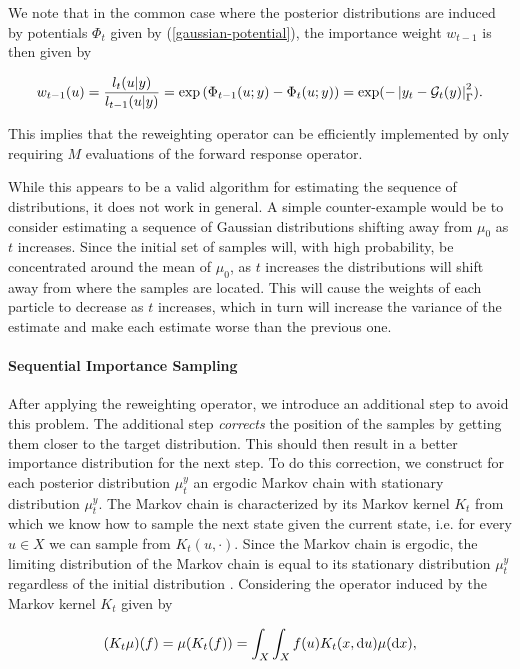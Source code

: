 We note that in the common case where the posterior distributions are induced by potentials $\Phi_t$ given by (\ref{gaussian-potential}), the importance weight $w_{t-1}$ is then given by

\begin{equation}\label{simple-weights}
  w_{t-1}(u) = \frac{l_t(u|y)}{l_{t-1}(u|y)} = \exp\left(\Phi_{t-1}(u;y) - \Phi_t(u;y)\right) = \exp(-\left|y_t - \mathcal{G}_t(y)\right|^2_\Gamma).
\end{equation}

This implies that the reweighting operator can be efficiently implemented by only requiring $M$ evaluations of the forward response operator.

While this appears to be a valid algorithm for estimating the sequence of distributions, it does not work in general. A simple counter-example would be to consider estimating a sequence of Gaussian distributions shifting away from $\mu_0$ as $t$ increases. Since the initial set of samples will, with high probability, be concentrated around the mean of $\mu_0$, as $t$ increases the distributions will shift away from where the samples are located. This will cause the weights of each particle to decrease as $t$ increases, which in turn will increase the variance of the estimate and make each estimate worse than the previous one.

\paragraph{Sequential Importance Sampling} After applying the reweighting operator, we introduce an additional step to avoid this problem. The additional step \textit{corrects} the position of the samples by getting them closer to the target distribution. This should then result in a better importance distribution for the next step. To do this correction, we construct for each posterior distribution $\mu^y_t$ an ergodic Markov chain with stationary distribution $\mu^y_t$. The Markov chain is characterized by its Markov kernel $K_t$ from which we know how to sample the next state given the current state, i.e. for every $u \in X$ we can sample from $K_t(u, \cdot)$. Since the Markov chain is ergodic, the limiting distribution of the Markov chain is equal to its stationary distribution $\mu^y_t$ regardless of the initial distribution \cite[Chapter 6]{Robert}. Considering the operator induced by the Markov kernel $K_t$ given by

\begin{equation*}
  (K_t\mu)(f) = \mu(K_t(f)) = \int_X\int_X f(u) K_t(x, \text{d} u) \mu(\text{d} x),
\end{equation*}

